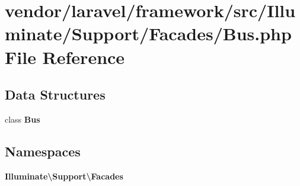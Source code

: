\section{vendor/laravel/framework/src/\+Illuminate/\+Support/\+Facades/\+Bus.php File Reference}
\label{_bus_8php}
\subsection*{Data Structures}
\begin{DoxyCompactItemize}
\item 
class {\bf Bus}
\end{DoxyCompactItemize}
\subsection*{Namespaces}
\begin{DoxyCompactItemize}
\item 
 {\bf Illuminate\textbackslash{}\+Support\textbackslash{}\+Facades}
\end{DoxyCompactItemize}
